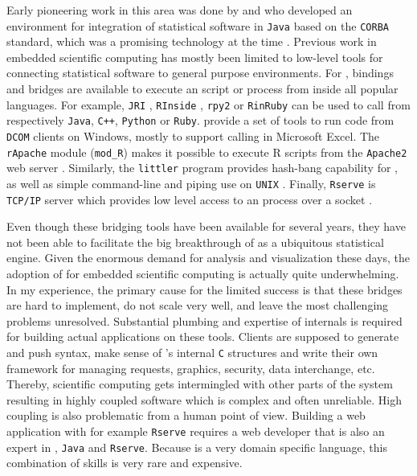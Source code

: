 Early pioneering work in this area was done by \cite{lang2000omegahat} and \cite{chambers1998distributed} who developed an environment for integration of statistical software in \texttt{Java} based on the \texttt{CORBA} standard, which was a promising technology at the time \citep{henning2006rise}.
Previous work in embedded scientific computing has mostly been limited to low-level tools for connecting statistical software to general purpose environments. For \R, bindings and bridges are available to execute an \R script or process from inside all popular languages. For example, \texttt{JRI} \citep{rjava}, \texttt{RInside} \citep{eddelbuettel2011rcpp}, \texttt{rpy2} \citep{gautier2008rpy2} or \texttt{RinRuby} \citep{dahl2008rinruby} can be used to call \R from respectively \texttt{Java}, \texttt{C++}, \texttt{Python} or \texttt{Ruby}. \cite{heiberger2009r} provide a set of tools to run \R code from \texttt{DCOM} clients on Windows, mostly to support calling \R in Microsoft Excel. The \texttt{rApache} module (\texttt{mod\_R}) makes it possible to execute R scripts from the \texttt{Apache2} web server \citep{horner2013rapache}. Similarly, the \texttt{littler} program provides hash-bang capability for \R, as well as simple command-line and piping use on \texttt{UNIX} \citep{littler}. Finally, \texttt{Rserve} is \texttt{TCP/IP} server which provides low level access to an \R process over a socket \citep{urbanek2013rserve}. 

Even though these bridging tools have been available for several years, they have not been able to facilitate the big breakthrough of \R as a ubiquitous statistical engine. Given the enormous demand for analysis and visualization these days, the adoption of \R for embedded scientific computing is actually quite underwhelming. In my experience, the primary cause for the limited success is that these bridges are hard to implement, do not scale very well, and leave the most challenging problems unresolved. Substantial plumbing and expertise of \R internals is required for building actual applications on these tools. Clients are supposed to generate and push \R syntax, make sense of \R's internal \texttt{C} structures and write their own framework for managing requests, graphics, security, data interchange, etc. Thereby, scientific computing gets intermingled with other parts of the system resulting in highly coupled software which is complex and often unreliable. High coupling is also problematic from a human point of view. Building a web application with for example \texttt{Rserve} requires a web developer that is also an expert in \R, \texttt{Java} and \texttt{Rserve}. Because \R is a very domain specific language, this combination of skills is very rare and expensive. 


